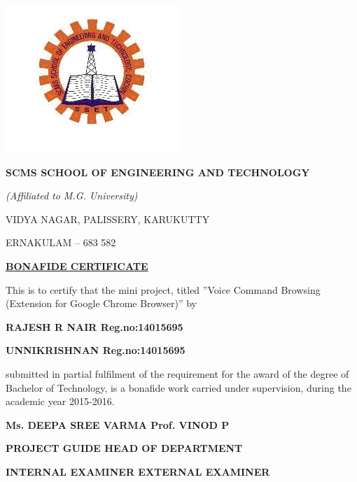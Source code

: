 \documentclass[11pt]{report} %
\begin{document}
	
	\thispagestyle{empty}
	\begin{center}
		\begin{minipage}{\linewidth}
			\centering
			\includegraphics[width=0.5\linewidth]{figures/logo.png}
			\vspace{1cm}
			\\
			
			{\Large \bf{SCMS SCHOOL OF ENGINEERING AND TECHNOLOGY}\par}
			{\Large \emph{(Affiliated to M.G. University)}\par}
			{\Large VIDYA NAGAR, PALISSERY, KARUKUTTY\par}
			{\Large ERNAKULAM – 683 582\par}
			\vspace{1cm}
			{\Large \bf{\underline{BONAFIDE CERTIFICATE}}\par}
			\vspace{0.5cm}
			\begin{flushleft}
				This is to certify that the mini project, titled ''Voice Command Browsing (Extension for Google Chrome  Browser)'' by
			\end{flushleft} 
			{ \bf{RAJESH R NAIR}\hspace{3cm}     Reg.no:14015695 \par}
			{ \bf{UNNIKRISHNAN}\hspace{3cm}      Reg.no:14015695 \par}
			\begin{flushleft}
				submitted in partial fulfilment of the requirement for the award of the degree of Bachelor of Technology, is a bonafide work carried under supervision, during the academic year 2015-2016.
			\end{flushleft}
			{ \bf{Ms. DEEPA SREE VARMA}\hspace{3.5cm}     Prof. VINOD P \par}
			{ \bf{PROJECT GUIDE}\hspace{3cm}      HEAD OF DEPARTMENT\par}
			
			\vspace{3cm}
			
			{ \bf{INTERNAL EXAMINER}\hspace{3cm}     EXTERNAL EXAMINER \par}
			
			
		\end{minipage}
	\end{center}
	\clearpage
	
\end{document}
